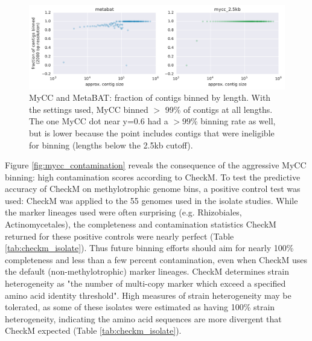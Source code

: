 \begin{figure}[H]
\centering
    \includegraphics[width=1.0\textwidth]{./tex/chapter2/figures/170206_improved_fracs_of_contigs_binned_by_MyCC.pdf}
    \begin{singlespace}
    \caption[MyCC and MetaBAT: fraction of contigs binned by length]{ %
        MyCC and MetaBAT: fraction of contigs binned by length.
        With the settings used, MyCC binned $>$ 99\% of contigs at all lengths. %
        The one MyCC dot near y=0.6 had a $>99\%$ binning rate as well, but is lower because the point includes contigs that were ineligible for binning (lengths below the 2.5kb cutoff).
        }
    \label{fig:mycc_binned_more_contigs}
    \end{singlespace}
\end{figure}

Figure \ref{fig:mycc_contamination} reveals the consequence of the aggressive MyCC binning: high contamination scores according to CheckM.
To test the predictive accuracy of CheckM on methylotrophic genome bins, a positive control test was used: CheckM was applied to the 55 genomes used in the isolate studies.
While the marker lineages used were often surprising (e.g. Rhizobiales, Actinomycetales), the completeness and contamination statistics CheckM returned for these positive controls were nearly perfect (Table \ref{tab:checkm_isolate}).
Thus future binning efforts should aim for nearly 100\% completeness and less than a few percent contamination, even when CheckM uses the default (non-methylotrophic) marker lineages.
CheckM determines strain heterogeneity as "the number of multi-copy marker which exceed a specified amino acid identity threshold".
High measures of strain heterogeneity may be tolerated, as some of these isolates were estimated as having 100\% strain heterogeneity, indicating the amino acid sequences are more divergent that CheckM expected (Table \ref{tab:checkm_isolate}).

